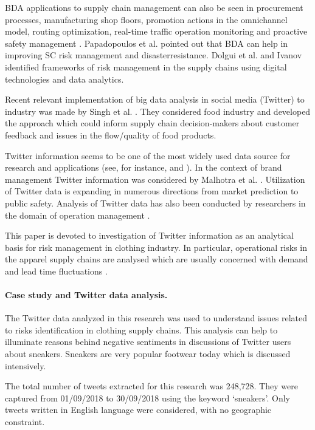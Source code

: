 BDA applications to supply chain management can also be seen in procurement processes, manufacturing shop floors, promotion actions in the omnichannel model, routing optimization, real-time traffic operation monitoring and proactive safety management \cite{GunasekaranTiwariDubey,NguyenZhouSpiegler}. Papadopoulos et al. \cite{PapadopoulosGunasekaranDubey} pointed out that BDA can help in improving SC risk management and disasterresistance. Dolgui et al. \cite{DolguiIvanovSokolov} and Ivanov \cite{Ivanov} identified frameworks of risk management in the supply chains using digital technologies and data analytics.

Recent relevant implementation of big data analysis in social media (Twitter) to industry was made by Singh et al. \cite{SinghShuklaMishra}. They considered food industry and developed the approach which could inform supply chain decision-makers about customer feedback and issues in the flow/quality of food products.

Twitter information seems to be one of the most widely used data source for research and applications (see, for instance, \cite{ChenElmesChang} and \cite{BodrunovaLitvinenkoBlekanov}). In the context of brand management Twitter information was considered by Malhotra et al. \cite{MalhotraMalhotraSee}. Utilization of Twitter data is expanding in numerous directions from market prediction to public safety. Analysis of Twitter data has also been conducted by researchers in the domain of operation management \cite{TanZhanJi,FanNiu}.

This paper is devoted to investigation of Twitter information as an analytical basis for risk management in clothing industry. In particular, operational risks in the apparel supply chains are analysed which are usually concerned with demand and lead time fluctuations \cite{Ivanov,IvanovDolguiSokolov}.

\paragraph{Case study and Twitter data analysis.} The Twitter data analyzed in this research was used to understand issues related to risks identification in clothing supply chains. This analysis can help to illuminate reasons behind negative sentiments in discussions of Twitter users about sneakers. Sneakers are very popular footwear today which is discussed intensively. 

The total number of tweets extracted for this research was 248,728. They were captured from 01/09/2018 to 30/09/2018 using the keyword ‘sneakers’. Only tweets written in English language were considered, with no geographic constraint.

